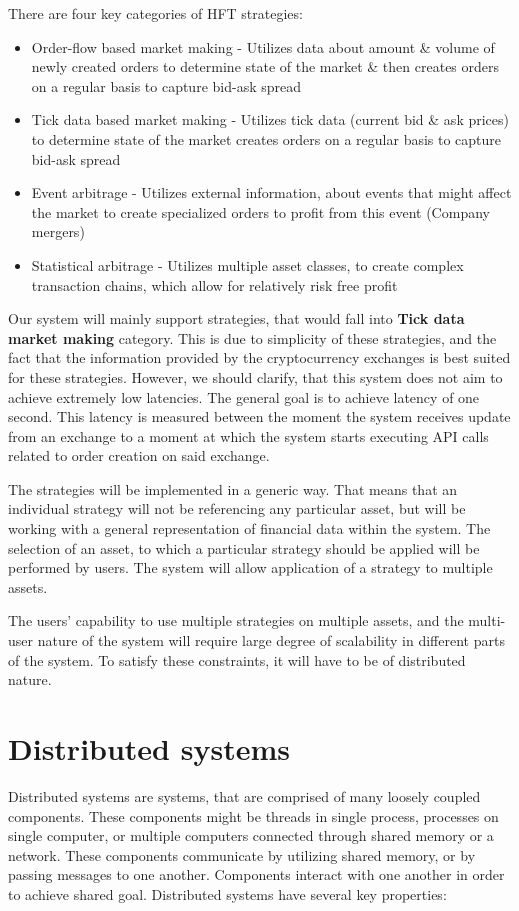 There are four key categories of HFT strategies\cite{wiki:hft}:
\begin{itemize}
    \item {Order-flow based market making -
    Utilizes data about amount \& volume of newly created orders to determine state of the market \& then
    creates orders on a regular basis to capture bid-ask spread }
    \item {Tick data based market making - Utilizes tick data (current bid \& ask prices) to determine state of the market
    creates orders on a regular basis to capture bid-ask spread }
    \item {Event arbitrage - Utilizes external information, about events that might affect the market to
    create specialized orders to profit from this event (Company mergers)}
    \item {Statistical arbitrage - Utilizes multiple asset classes, to create complex transaction chains, which allow for relatively risk free profit }
\end{itemize}

Our system will mainly support strategies, that would fall into \textbf{Tick data market making} category. This is due
to simplicity of these strategies, and the fact that the information provided by the cryptocurrency exchanges is best suited
for these strategies. However, we should clarify, that this system does not aim to achieve extremely low latencies.
The general goal is to achieve latency of one second. This latency is measured between the moment the system receives
update from an exchange to a moment at which the system starts executing API calls related to order creation on said exchange.

The strategies will be implemented in a generic way. That means that an individual strategy will not be referencing any
particular asset, but will be working with a general representation of financial data within the system. The selection
of an asset, to which a particular strategy should be applied will be performed by users. The system will allow
application of a strategy to multiple assets.

The users' capability to use multiple strategies on multiple assets, and the multi-user nature of the system will
require large degree of scalability in different parts of the system. To satisfy these constraints, it will have to be of distributed nature.

\section{Distributed systems}
Distributed systems are systems, that are comprised of many loosely coupled components. These components might be threads
in single process, processes on single computer, or multiple computers connected through shared memory or a network.
These components communicate by utilizing shared memory, or by passing messages to one another. Components interact with
one another in order to achieve shared goal. Distributed systems have several key properties\cite{Coulouris:2011:DSC:2029110}:

